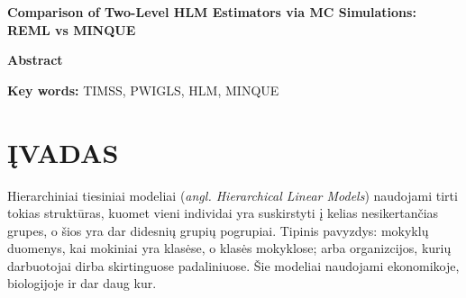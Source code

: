 \documentclass[12pt,a4paper]{article}
\begin{document}
\begin{center}{\large\textbf{Comparison of Two-Level HLM Estimators via MC Simulations: REML vs MINQUE}}\end{center}

\begin{small}
\vspace{2\baselineskip}
\begin{center}\textbf{Abstract}\end{center}


\vspace{\baselineskip}

\noindent\textbf{Key words:}
TIMSS, PWIGLS, HLM, MINQUE
\end{small}
\vspace{\baselineskip}

\newpage
\section{ĮVADAS}

\indent Hierarchiniai tiesiniai modeliai (\textit{angl. Hierarchical Linear Models}) naudojami tirti tokias struktūras, kuomet vieni individai yra suskirstyti į kelias nesikertančias grupes, o šios yra dar didesnių grupių pogrupiai. Tipinis pavyzdys: mokyklų duomenys, kai mokiniai yra klasėse, o klasės mokyklose; arba organizcijos, kurių darbuotojai dirba skirtinguose padaliniuose. Šie modeliai naudojami ekonomikoje, biologijoje ir dar daug kur.\cite{cek}
\end{document}
